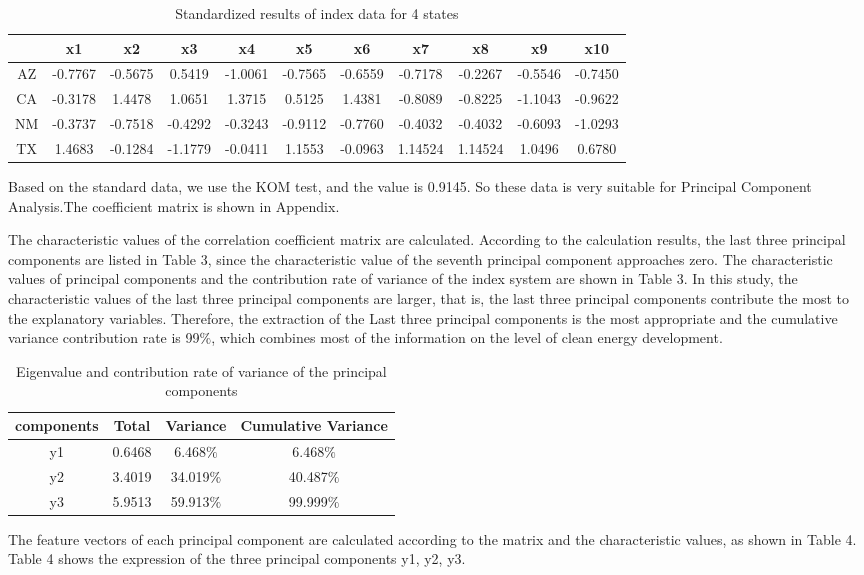 \documentclass{mcmthesis}
\begin{document}
\begin{enumerate}
      \begin{table}
      \begin{tabular}{|c|c|c|c|c|c|c|c|c|c|c|}
      \hline
      { }&x1&x2&x3&x4&x5&x6&x7&x8&x9&x10\\
      \hline
      {AZ}&-0.7767&-0.5675&0.5419&-1.0061&-0.7565&-0.6559&-0.7178&-0.2267&-0.5546&-0.7450\\
      \hline
      {CA}&-0.3178&1.4478&1.0651&1.3715&0.5125&1.4381&-0.8089&-0.8225&-1.1043&-0.9622\\
      \hline
      {NM}&-0.3737&-0.7518&-0.4292&-0.3243&-0.9112&-0.7760&-0.4032&-0.4032&-0.6093&-1.0293\\
      \hline
      {TX}&1.4683&-0.1284&-1.1779&-0.0411&1.1553&-0.0963&1.14524&1.14524&1.0496&0.6780\\
      \hline
      \end{tabular}
      \caption{Standardized results of index data for 4 states}
      \end{table}
      Based on the standard data, we use the KOM test, and the value is 0.9145. So these data is very suitable for Principal Component Analysis.The coefficient matrix is shown in Appendix.

      The characteristic values of the correlation coefficient matrix are calculated. According to the calculation results, the last three principal components are listed in Table 3, since the characteristic value of the seventh principal component approaches zero. The characteristic values of principal components and the contribution rate of variance of the index system are shown in Table 3. In this study, the characteristic values of the last three principal components are larger, that is, the last three principal components contribute the most to the explanatory variables. Therefore, the extraction of the Last three principal components is the most appropriate and the cumulative variance contribution rate is 99$\%$, which combines most of the information on the level of clean energy development.
      \begin{table}
      \begin{tabular}{|c|c|c|c|}
      \hline
      { components }&{Total}&{Variance}&{Cumulative Variance}\\
      \hline
      {y1}&0.6468&6.468$\%$&6.468$\%$\\
      \hline
      {y2}&3.4019&34.019$\%$ & 40.487$\%$\\
      \hline
      {y3}&5.9513&59.913$\%$ & 99.999$\%$\\
      \hline
      \end{tabular}
      \caption{Eigenvalue and contribution rate of variance of the principal components}
      \end{table}
        The feature vectors of each principal component are calculated according to the matrix and the characteristic values, as shown in Table 4. Table 4 shows the expression of the three principal components y1, y2, y3.


\end{enumerate}
\end{document}
